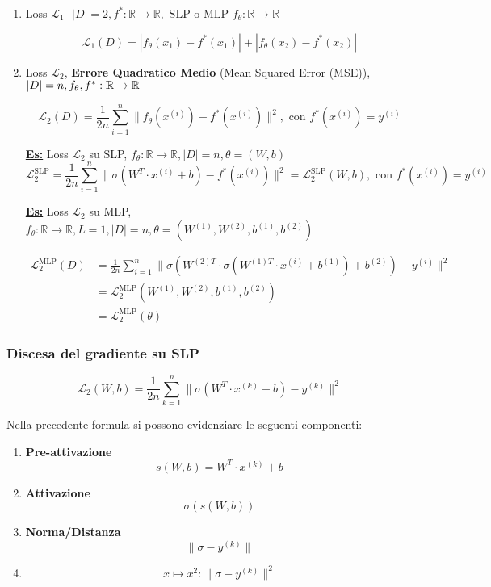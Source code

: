 \documentclass[a4paper,12pt]{article}
\newcommand{\esempio}{\noindent\textbf{\underline{Es:}} }
\begin{document}
	\begin{enumerate}
		\item Loss $\mathcal{L}_1 \ \ \ |D| = 2, f^* : \mathbb{R} \rightarrow \mathbb{R}, \text{ SLP o MLP } f_\theta : \mathbb{R} \rightarrow \mathbb{R} $

		\[
		\mathcal{L}_1 (D) = | f_\theta(x_1) - f^*(x_1)| + | f_\theta(x_2) - f^*(x_2) |
		\]
		\item Loss $\mathcal{L}_2$, \textbf{Errore Quadratico Medio} (Mean Squared Error (MSE)), $|D| = n, \\  f_\theta, f^* : \mathbb{R} \rightarrow \mathbb{R}$

		\[
		\mathcal{L}_2 (D) = \frac{1}{2n} \sum_{i = 1}^{n} \| f_\theta (x^{(i)}) - f^*(x^{(i)})  \|^2, \text{ con } f^*(x^{(i)}) = y^{(i)}
		\]

		\esempio Loss $\mathcal{L}_2$ su SLP, $f_\theta : \mathbb{R} \rightarrow \mathbb{R}, |D| = n, \theta = (W,b)$
		\[
		\mathcal{L}_2^{\text{SLP}} = \frac{1}{2n} \sum_{i = 1}^{n} \| \sigma (W^T \cdot x^{(i)} + b ) - f^*(x^{(i)}) \|^2 = \mathcal{L}_2^{\text{SLP}}(W,b), \text{ con }  f^*(x^{(i)}) = y^{(i)}
		\]

		\esempio Loss $\mathcal{L}_2$ su MLP, $ f_\theta : \mathbb{R} \rightarrow \mathbb{R}, L = 1, |D| = n, \theta = (W^{(1)}, W^{(2)}, b^{(1)}, b^{(2)})$

		\begin{align*}
			\mathcal{L}_2^{\text{MLP}} (D) &= \frac{1}{2n} \sum_{i=1}^{n} \| \sigma ( W^{(2)T} \cdot \sigma(W^{(1) T} \cdot x^{(i)} + b^{(1)} ) + b^{(2)} ) - y^{(i)}\|^2 \\
			&= \mathcal{L}_2^{\text{MLP}}(W^{(1)}, W^{(2)}, b^{(1)}, b^{(2)}) \\
			&= \mathcal{L}_2^{\text{MLP}}(\theta)
		\end{align*}

	\end{enumerate}

	\subsubsection{Discesa del gradiente su SLP}

	\[
	\mathcal{L}_2 (W,b) = \frac{1}{2n} \sum_{k = 1}^{n} \| \sigma (W^T \cdot x^{(k)} + b) - y^{(k)} \|^2
	\]

	\noindent Nella precedente formula si possono evidenziare le seguenti componenti:

	\begin{enumerate}
		\item \textbf{Pre-attivazione}
		\[
		s(W,b) = W^T \cdot x^{(k)} + b
		\]
		\item \textbf{Attivazione}
		\[
		\sigma ( s(W,b))
		\]
		\item \textbf{Norma/Distanza}
		\[
		\| \sigma - y^{(k)} \|
		\]
		\item
		\[
		x \mapsto x^2 : \| \sigma - y^{(k)} \|^2
		\]
	\end{enumerate}
\end{document}
